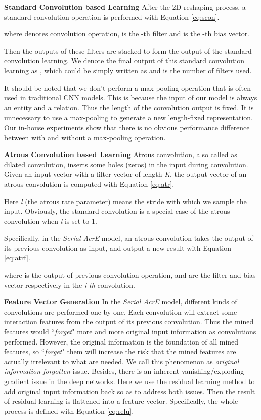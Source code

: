 \documentclass[11pt]{article}
\begin{document}
\noindent\textbf{Standard Convolution based Learning} After the 2D reshaping process, a standard convolution operation is performed with Equation \ref{eq:scon}.


where  denotes convolution operation,  is the -th filter and  is the -th bias vector.

Then the outputs of these filters are stacked to form the output of the standard convolution learning. We denote the final output of this standard convolution learning as  , which could be simply written as   and  is the number of filters used.









It should be noted that we don’t perform a max-pooling operation that is often used in traditional CNN models. This is because the input of our model is always an entity and a relation. Thus the length of the convolution output is fixed. It is unnecessary to use a max-pooling to generate a new length-fixed representation. Our in-house experiments show that there is no obvious performance difference  between with and without a max-pooling operation. 

\noindent\textbf{Atrous Convolution based Learning} Atrous convolution, also called as dilated convolution, inserts some holes (zeros) in the input during convolution. Given an input vector   with a filter vector   of length \emph{K}, the output vector   of an atrous convolution is computed with Equation \ref{eq:atr}.



Here \emph{l} (the atrous rate parameter) means the stride with which we sample the input. Obviously, the standard convolution is a special case of the atrous convolution when \emph{l} is set to 1. 

Specifically, in the \emph{Serial AcrE} model, an atrous convolution takes the output of its previous convolution as input, and output a new result with Equation \ref{eq:atrf}.



where  is the output of previous convolution operation,   and  are the filter and bias vector respectively in the \emph{i-th} convolution. 

\noindent\textbf{Feature Vector Generation} In the \emph{Serial AcrE} model, different kinds of convolutions are performed one by one. Each convolution will extract some interaction features from the output of its previous convolution. Thus   the mined features would ``\emph{forget}" more and more original input information as  convolutions performed. However, the original information is the foundation of all mined features, so ``\emph{forget}" them will increase the risk that the mined features are actually irrelevant to what are needed. We call this phenomenon as \emph{original information forgotten} issue. Besides, there is an inherent  vanishing/exploding gradient issue in the deep networks. Here  we use the residual learning method \cite{He:2016} to add original input information back so as to address both issues. Then the result of residual learning is  flattened into a feature vector. Specifically, the whole process is defined with Equation \ref{eq:relu}.
\end{document}
